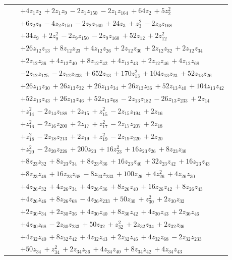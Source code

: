 \begin{longtable}{@{}r p{0.88\linewidth}@{}}
 & $+4z_{1}z_{2}\,+2z_{1}z_{9}\,-2z_{1}z_{150}\,-2z_{1}z_{164}\,+64z_{2}\,+5z_{2}^{2}$\\
 & $+6z_{2}z_{9}\,-4z_{2}z_{150}\,-2z_{2}z_{160}\,+24z_{3}\,+z_{3}^{2}\,-2z_{3}z_{168}$\\
 & $+34z_{9}\,+2z_{9}^{2}\,-2z_{9}z_{150}\,-2z_{9}z_{160}\,+52z_{12}\,+2z_{12}^{2}$\\
 & $+26z_{12}z_{13}\,+8z_{12}z_{23}\,+4z_{12}z_{26}\,+2z_{12}z_{30}\,+2z_{12}z_{32}\,+2z_{12}z_{34}$\\
 & $+2z_{12}z_{36}\,+4z_{12}z_{40}\,+8z_{12}z_{42}\,+4z_{12}z_{43}\,+2z_{12}z_{46}\,+4z_{12}z_{68}$\\
 & $-2z_{12}z_{175}\,-2z_{12}z_{233}\,+652z_{13}\,+170z_{13}^{2}\,+104z_{13}z_{23}\,+52z_{13}z_{26}$\\
 & $+26z_{13}z_{30}\,+26z_{13}z_{32}\,+26z_{13}z_{34}\,+26z_{13}z_{36}\,+52z_{13}z_{40}\,+104z_{13}z_{42}$\\
 & $+52z_{13}z_{43}\,+26z_{13}z_{46}\,+52z_{13}z_{68}\,-2z_{13}z_{182}\,-26z_{13}z_{233}\,+2z_{14}$\\
 & $+z_{14}^{2}\,-2z_{14}z_{188}\,+2z_{15}\,+z_{15}^{2}\,-2z_{15}z_{194}\,+2z_{16}$\\
 & $+z_{16}^{2}\,-2z_{16}z_{200}\,+2z_{17}\,+z_{17}^{2}\,-2z_{17}z_{207}\,+2z_{18}$\\
 & $+z_{18}^{2}\,-2z_{18}z_{213}\,+2z_{19}\,+z_{19}^{2}\,-2z_{19}z_{220}\,+2z_{20}$\\
 & $+z_{20}^{2}\,-2z_{20}z_{226}\,+200z_{23}\,+16z_{23}^{2}\,+16z_{23}z_{26}\,+8z_{23}z_{30}$\\
 & $+8z_{23}z_{32}\,+8z_{23}z_{34}\,+8z_{23}z_{36}\,+16z_{23}z_{40}\,+32z_{23}z_{42}\,+16z_{23}z_{43}$\\
 & $+8z_{23}z_{46}\,+16z_{23}z_{68}\,-8z_{23}z_{233}\,+100z_{26}\,+4z_{26}^{2}\,+4z_{26}z_{30}$\\
 & $+4z_{26}z_{32}\,+4z_{26}z_{34}\,+4z_{26}z_{36}\,+8z_{26}z_{40}\,+16z_{26}z_{42}\,+8z_{26}z_{43}$\\
 & $+4z_{26}z_{46}\,+8z_{26}z_{68}\,-4z_{26}z_{233}\,+50z_{30}\,+z_{30}^{2}\,+2z_{30}z_{32}$\\
 & $+2z_{30}z_{34}\,+2z_{30}z_{36}\,+4z_{30}z_{40}\,+8z_{30}z_{42}\,+4z_{30}z_{43}\,+2z_{30}z_{46}$\\
 & $+4z_{30}z_{68}\,-2z_{30}z_{233}\,+50z_{32}\,+z_{32}^{2}\,+2z_{32}z_{34}\,+2z_{32}z_{36}$\\
 & $+4z_{32}z_{40}\,+8z_{32}z_{42}\,+4z_{32}z_{43}\,+2z_{32}z_{46}\,+4z_{32}z_{68}\,-2z_{32}z_{233}$\\
 & $+50z_{34}\,+z_{34}^{2}\,+2z_{34}z_{36}\,+4z_{34}z_{40}\,+8z_{34}z_{42}\,+4z_{34}z_{43}$\\

\end{longtable}
